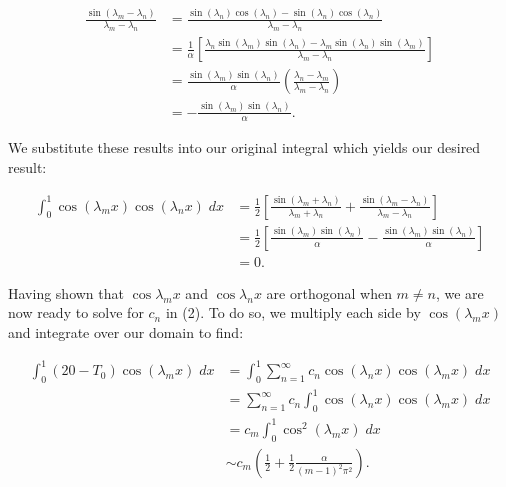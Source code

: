 \begin{solution}
    \begin{align*}
        \frac{\sin{(\lambda_m - \lambda_n)}}{\lambda_m - \lambda_n}
        &= \frac{\sin{(\lambda_n)} \cos{(\lambda_n) - \sin{(\lambda_n)}} \cos{(\lambda_n)}}{\lambda_m - \lambda_n} \\
        &= \frac{1}{\alpha} \left[ \frac{\lambda_n \sin{(\lambda_m)} \sin{(\lambda_n) - \lambda_m} \sin{(\lambda_n)} \sin{(\lambda_m)}}{\lambda_m - \lambda_n} \right] \\
        &= \frac{\sin{(\lambda_m)} \sin{(\lambda_n)}}{\alpha} \left( \frac{\lambda_n - \lambda_m}{\lambda_m - \lambda_n} \right) \\
        &= -\frac{\sin{(\lambda_m)} \sin{(\lambda_n)}}{\alpha}.
    \end{align*}


    \pagebreak
    We substitute these results into our original integral which yields our desired result:

    \begin{align*}
        \int_{0}^{1}{\cos{(\lambda_m x)}\cos{(\lambda_n x)}\; dx} &= \frac{1}{2} \left[ \frac{\sin{(\lambda_m + \lambda_n)}}{\lambda_m + \lambda_n} + \frac{\sin{(\lambda_m - \lambda_n)}}{\lambda_m - \lambda_n} \right] \\
                                                                  &= \frac{1}{2} \left[ \frac{\sin{(\lambda_m)} \sin{(\lambda_n)}}{\alpha} - \frac{\sin{(\lambda_m)} \sin{(\lambda_n)}}{\alpha} \right] \\
                                                                  &= 0.
    \end{align*}
    
    Having shown that $\cos{\lambda_m x}$ and $\cos{\lambda_n x}$ are orthogonal when $m \neq n$, we are now ready to solve for $c_n$ in (2).
    To do so, we multiply each side by $\cos{(\lambda_m x)}$ and integrate over our domain to find:

    \begin{align*}
        \int_{0}^{1}{(20 - T_0) \cos{(\lambda_m x)}\; dx} &= \int_{0}^{1}{\sum_{n=1}^{\infty}{c_n \cos{(\lambda_n x)}} \cos{(\lambda_m x)}\; dx} \\
                                                          &= \sum_{n=1}^{\infty}{c_n  \int_{0}^{1}{\cos{(\lambda_n x)} \cos{(\lambda_m x)}\; dx} } \\
                                                          &= c_m \int_{0}^{1}{\cos^2{(\lambda_m x)}\; dx} \\
                                                          &\sim c_m \left(\frac{1}{2} + \frac{1}{2}\frac{\alpha}{(m-1)^2 \pi^2} \right).
    \end{align*}


\end{solution}
